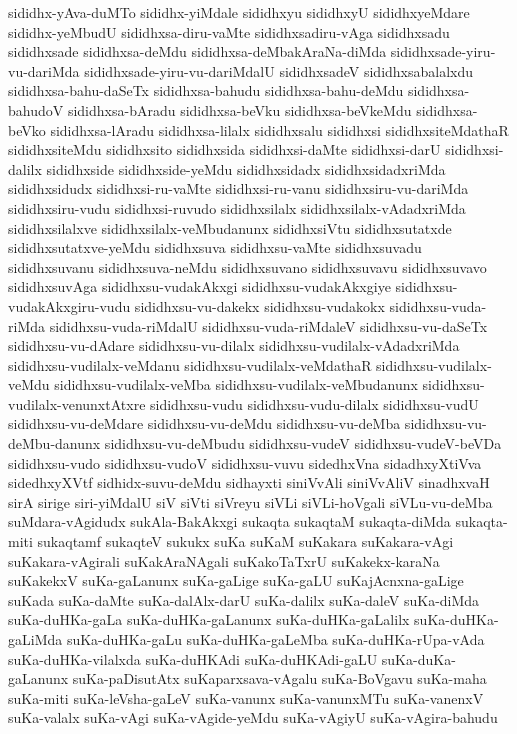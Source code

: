 {sididhx-yAva-duMTo
sididhx-yiMdale
sididhxyu
sididhxyU
sididhxyeMdare
sididhx-yeMbudU
sididhxsa-diru-vaMte
sididhxsadiru-vAga
sididhxsadu
sididhxsade
sididhxsa-deMdu
sididhxsa-deMbakAraNa-diMda
sididhxsade-yiru-vu-dariMda
sididhxsade-yiru-vu-dariMdalU
sididhxsadeV
sididhxsabalalxdu
sididhxsa-bahu-daSeTx
sididhxsa-bahudu
sididhxsa-bahu-deMdu
sididhxsa-bahudoV
sididhxsa-bAradu
sididhxsa-beVku
sididhxsa-beVkeMdu
sididhxsa-beVko
sididhxsa-lAradu
sididhxsa-lilalx
sididhxsalu
sididhxsi
sididhxsiteMdathaR
sididhxsiteMdu
sididhxsito
sididhxsida
sididhxsi-daMte
sididhxsi-darU
sididhxsi-dalilx
sididhxside
sididhxside-yeMdu
sididhxsidadx
sididhxsidadxriMda
sididhxsidudx
sididhxsi-ru-vaMte
sididhxsi-ru-vanu
sididhxsiru-vu-dariMda
sididhxsiru-vudu
sididhxsi-ruvudo
sididhxsilalx
sididhxsilalx-vAdadxriMda
sididhxsilalxve
sididhxsilalx-veMbudanunx
sididhxsiVtu
sididhxsutatxde
sididhxsutatxve-yeMdu
sididhxsuva
sididhxsu-vaMte
sididhxsuvadu
sididhxsuvanu
sididhxsuva-neMdu
sididhxsuvano
sididhxsuvavu
sididhxsuvavo
sididhxsuvAga
sididhxsu-vudakAkxgi
sididhxsu-vudakAkxgiye
sididhxsu-vudakAkxgiru-vudu
sididhxsu-vu-dakekx
sididhxsu-vudakokx
sididhxsu-vuda-riMda
sididhxsu-vuda-riMdalU
sididhxsu-vuda-riMdaleV
sididhxsu-vu-daSeTx
sididhxsu-vu-dAdare
sididhxsu-vu-dilalx
sididhxsu-vudilalx-vAdadxriMda
sididhxsu-vudilalx-veMdanu
sididhxsu-vudilalx-veMdathaR
sididhxsu-vudilalx-veMdu
sididhxsu-vudilalx-veMba
sididhxsu-vudilalx-veMbudanunx
sididhxsu-vudilalx-venunxtAtxre
sididhxsu-vudu
sididhxsu-vudu-dilalx
sididhxsu-vudU
sididhxsu-vu-deMdare
sididhxsu-vu-deMdu
sididhxsu-vu-deMba
sididhxsu-vu-deMbu-danunx
sididhxsu-vu-deMbudu
sididhxsu-vudeV
sididhxsu-vudeV-beVDa
sididhxsu-vudo
sididhxsu-vudoV
sididhxsu-vuvu
sidedhxVna
sidadhxyXtiVva
sidedhxyXVtf
sidhidx-suvu-deMdu
sidhayxti
siniVvAli
siniVvAliV
sinadhxvaH
sirA
sirige
siri-yiMdalU
siV
siVti
siVreyu
siVLi
siVLi-hoVgali
siVLu-vu-deMba
suMdara-vAgidudx
sukAla-BakAkxgi
sukaqta
sukaqtaM
sukaqta-diMda
sukaqta-miti
sukaqtamf
sukaqteV
sukukx
suKa
suKaM
suKakara
suKakara-vAgi
suKakara-vAgirali
suKakAraNAgali
suKakoTaTxrU
suKakekx-karaNa
suKakekxV
suKa-gaLanunx
suKa-gaLige
suKa-gaLU
suKajAcnxna-gaLige
suKada
suKa-daMte
suKa-dalAlx-darU
suKa-dalilx
suKa-daleV
suKa-diMda
suKa-duHKa-gaLa
suKa-duHKa-gaLanunx
suKa-duHKa-gaLalilx
suKa-duHKa-gaLiMda
suKa-duHKa-gaLu
suKa-duHKa-gaLeMba
suKa-duHKa-rUpa-vAda
suKa-duHKa-vilalxda
suKa-duHKAdi
suKa-duHKAdi-gaLU
suKa-duKa-gaLanunx
suKa-paDisutAtx
suKaparxsava-vAgalu
suKa-BoVgavu
suKa-maha
suKa-miti
suKa-leVsha-gaLeV
suKa-vanunx
suKa-vanunxMTu
suKa-vanenxV
suKa-valalx
suKa-vAgi
suKa-vAgide-yeMdu
suKa-vAgiyU
suKa-vAgira-bahudu
}
